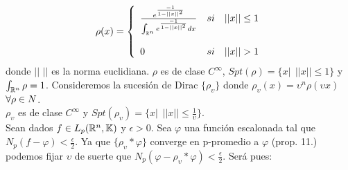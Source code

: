  \begin{equation*}
\rho (x)=\left\{ \begin{array}{lcc}
           \frac{e^{\frac{-1}{1-||x||^2}}}{\int_{\mathbb{R}^n}e^{\frac{-1}{1-||x||^2}}dx} & si & ||x||\leq 1 \\
             \\  0 & si &||x|| > 1 \\
             \end{array}
   \right.
\end{equation*}
donde $||$ $||$ es la norma euclidiana. $\rho$ es de clase $C^\infty$, $Spt(\rho)=\lbrace x| \phantom{s} ||x|| \leq 1 \rbrace$ y $\int_{\mathbb{R}^n}\rho=1$. Consideremos la sucesión de Dirac $\lbrace \rho_\upsilon \rbrace$ donde $\rho_\upsilon (x)=\upsilon^n \rho (\upsilon x)$ $\forall \rho \in N$.\\
$\rho_\upsilon$ es de clase $C^\infty$ y $Spt(\rho_\upsilon)=\lbrace x | \phantom{s} ||x|| \leq \frac{1}{\upsilon} \rbrace$. \\
Sean dados $f \in L_p (\mathbb{R}^n,\mathbb{K})$ y $\epsilon >0$. Sea $\varphi$ una función escalonada tal que  $N_p (f-\varphi)<\frac{\epsilon}{2}$. Ya que $\lbrace \rho_\upsilon * \varphi \rbrace$ converge en p-promedio a $\varphi$ (prop. 11.) podemos fijar $\upsilon$ de suerte que $N_p (\varphi -\rho_\upsilon * \varphi) < \frac{\epsilon}{2}$. Será pues:

